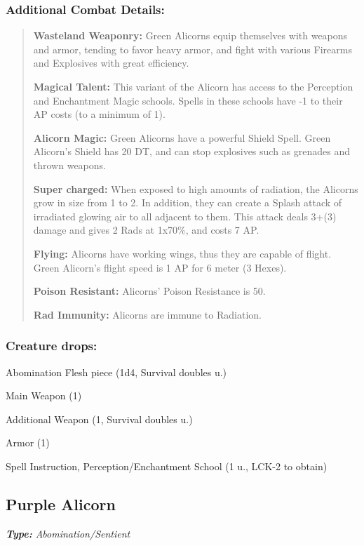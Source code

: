 \documentclass[11pt,a4paper,twocolumn]{book}
\begin{document}
	\subsubsection*{Additional Combat Details:}
	\begin{verse}
		\textbf{Wasteland Weaponry:} Green Alicorns equip themselves with weapons and armor, tending to favor heavy armor, and fight with various Firearms and Explosives with great efficiency.
		
		\textbf{Magical Talent:} This variant of the Alicorn has access to the Perception and Enchantment Magic schools. Spells in these schools have -1 to their AP costs (to a minimum of 1).
		
		\textbf{Alicorn Magic:} Green Alicorns have a powerful Shield Spell. Green Alicorn's Shield has 20 DT, and can stop explosives such as grenades and thrown weapons.
		
		\textbf{Super charged:} When exposed to high amounts of radiation, the Alicorns grow in size from 1 to 2. In addition, they can create a Splash attack of irradiated glowing air to all adjacent to them. This attack deals 3+(3) damage and gives 2 Rads at 1x70\%, and costs 7 AP.
		
		\textbf{Flying:} Alicorns have working wings, thus they are capable of flight. Green Alicorn's flight speed is 1 AP for 6 meter (3 Hexes).
		
		\textbf{Poison Resistant:} Alicorns' Poison Resistance is 50.
		
		\textbf{Rad Immunity:} Alicorns are immune to Radiation.
	\end{verse}
	
	\subsubsection*{Creature drops:}
	\begin{compactitem}
		\item Abomination Flesh piece (1d4, Survival doubles u.)
		\item Main Weapon (1)
		\item Additional Weapon (1, Survival doubles u.)
		\item Armor (1)
		\item Spell Instruction, Perception/Enchantment School (1 u., LCK-2 to obtain)
	\end{compactitem}
	
	\vfill
	
	\subsection*{Purple Alicorn}
	\emph{\textbf{Type:} Abomination/Sentient}
	
\end{document}
